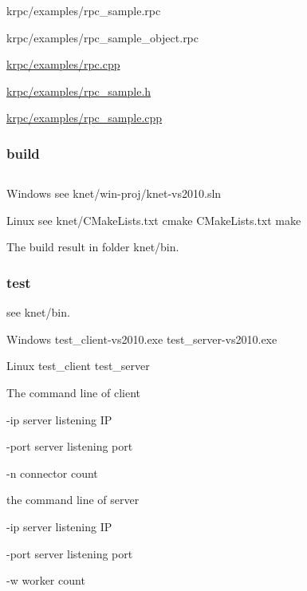 \begin{DoxyItemize}
\item {\ttfamily krpc/examples/rpc\+\_\+sample.\+rpc}
\item {\ttfamily krpc/examples/rpc\+\_\+sample\+\_\+object.\+rpc}
\item {\ttfamily \hyperlink{rpc_8cpp}{krpc/examples/rpc.\+cpp}}
\item {\ttfamily \hyperlink{rpc__sample_8h}{krpc/examples/rpc\+\_\+sample.\+h}}
\item {\ttfamily \hyperlink{rpc__sample_8cpp}{krpc/examples/rpc\+\_\+sample.\+cpp}}
\end{DoxyItemize}

\subsubsection*{build}

\subsection*{}


\begin{DoxyEnumerate}
\item Windows see {\ttfamily knet/win-\/proj/knet-\/vs2010.\+sln}
\item Linux see {\ttfamily knet/\+C\+Make\+Lists.\+txt} {\ttfamily cmake C\+Make\+Lists.\+txt} {\ttfamily make}
\end{DoxyEnumerate}

The build result in folder {\ttfamily knet/bin}.

\subsubsection*{test}

see {\ttfamily knet/bin}.


\begin{DoxyEnumerate}
\item Windows {\ttfamily test\+\_\+client-\/vs2010.\+exe} {\ttfamily test\+\_\+server-\/vs2010.\+exe}
\item Linux {\ttfamily test\+\_\+client} {\ttfamily test\+\_\+server}
\item The command line of client
\begin{DoxyEnumerate}
\item {\ttfamily -\/ip} server listening I\+P
\item {\ttfamily -\/port} server listening port
\item {\ttfamily -\/n} connector count
\end{DoxyEnumerate}
\item the command line of server
\begin{DoxyEnumerate}
\item {\ttfamily -\/ip} server listening I\+P
\item {\ttfamily -\/port} server listening port
\item {\ttfamily -\/w} worker count 
\end{DoxyEnumerate}
\end{DoxyEnumerate}